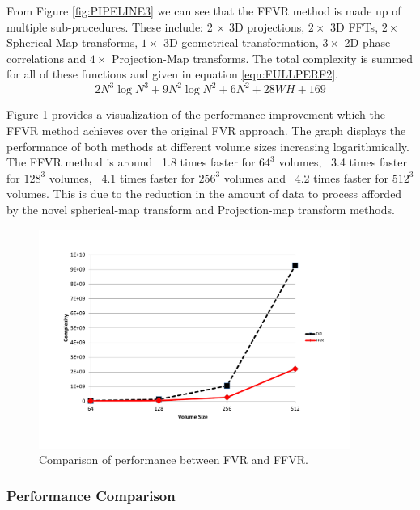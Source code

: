 From Figure \ref{fig:PIPELINE3} we can see that the FFVR method is made up of multiple sub-procedures. These include: 2 $\times$ 3D projections, $2 \times$ 3D FFTs, $2 \times$ Spherical-Map transforms, $1 \times$ 3D geometrical transformation, $3 \times$ 2D phase correlations and $4 \times$ Projection-Map transforms. The total complexity is summed for all of these functions and given in equation \ref{eqn:FULLPERF2}. \\

\begin{equation} \label{eqn:FULLPERF2}
2N^3\log{N^3} + 9N^2\log{N^2} + 6N^2 + 28WH + 169
\end{equation}

Figure \ref{fig:perfComp} provides a visualization of the performance improvement which the FFVR method achieves over the original FVR approach. The graph displays the performance of both methods at different volume sizes increasing logarithmically. The FFVR method is around ~1.8 times faster for $64^3$ volumes, ~3.4 times faster for $128^3$ volumes, ~4.1 times faster for $256^3$ volumes and ~4.2 times faster for $512^3$ volumes. This is due to the reduction in the amount of data to process afforded by the novel spherical-map transform and Projection-map transform methods.

\begin{figure}[!htb]
\centering
\includegraphics[width=4.0in]{images/methodology/FVR/performanceImprovement}
\caption{Comparison of performance between FVR and FFVR.}
\label{fig:perfComp}
\end{figure}

\subsubsection{Performance Comparison}

